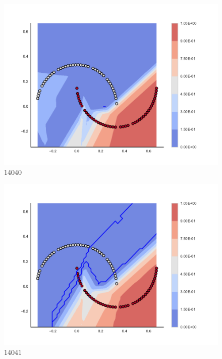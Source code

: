 \begin{subfigure}[b]{0.09\textwidth}
    \includegraphics[clip, trim=2.35cm 1.75cm 4.5cm 0cm,width=\textwidth]{img/convergence/14040.pdf}
    \caption{14040}
    \label{fig:convergence_14040}
\end{subfigure}
%
\begin{subfigure}[b]{0.09\textwidth}
    \includegraphics[clip, trim=2.35cm 1.75cm 4.5cm 0cm,width=\textwidth]{img/convergence/14041.pdf}
    \caption{14041}
    \label{fig:convergence_14041}
\end{subfigure}
%

